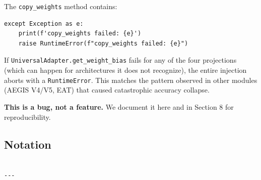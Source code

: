 The \texttt{copy\_weights} method contains:

\begin{lstlisting}
except Exception as e:
    print(f'copy_weights failed: {e}')
    raise RuntimeError(f"copy_weights failed: {e}")
\end{lstlisting}

If \texttt{UniversalAdapter.get\_weight\_bias} fails for any of the four 
projections (which can happen for architectures it does not recognize), 
the entire injection aborts with a \texttt{RuntimeError}. This matches the 
pattern observed in other modules (AEGIS V4/V5, EAT) that caused 
catastrophic accuracy collapse.

\textbf{This is a bug, not a feature.} We document it here and in Section 8 
for reproducibility.



\subsection{Notation}

\begin{lstlisting}

---
\end{lstlisting}